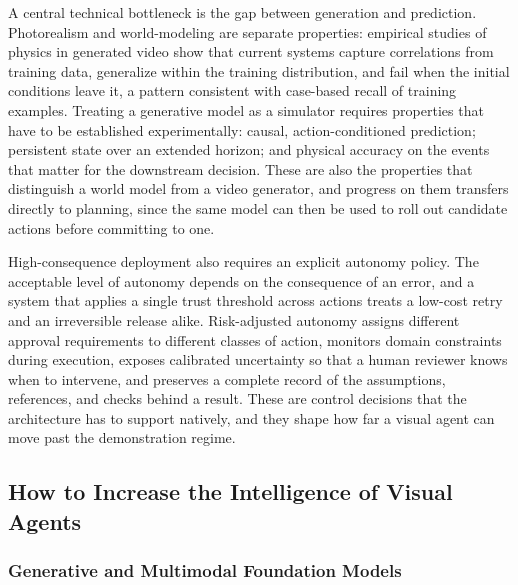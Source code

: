 A central technical bottleneck is the gap between generation and prediction. Photorealism and world-modeling are separate properties: empirical studies of physics in generated video show that current systems capture correlations from training data, generalize within the training distribution, and fail when the initial conditions leave it, a pattern consistent with case-based recall of training examples. Treating a generative model as a simulator requires properties that have to be established experimentally: causal, action-conditioned prediction; persistent state over an extended horizon; and physical accuracy on the events that matter for the downstream decision. These are also the properties that distinguish a world model from a video generator, and progress on them transfers directly to planning, since the same model can then be used to roll out candidate actions before committing to one.

High-consequence deployment also requires an explicit autonomy policy. The acceptable level of autonomy depends on the consequence of an error, and a system that applies a single trust threshold across actions treats a low-cost retry and an irreversible release alike. Risk-adjusted autonomy assigns different approval requirements to different classes of action, monitors domain constraints during execution, exposes calibrated uncertainty so that a human reviewer knows when to intervene, and preserves a complete record of the assumptions, references, and checks behind a result. These are control decisions that the architecture has to support natively, and they shape how far a visual agent can move past the demonstration regime.

\subsection{How to Increase the Intelligence of Visual Agents}

\subsubsection{Generative and Multimodal Foundation Models}

